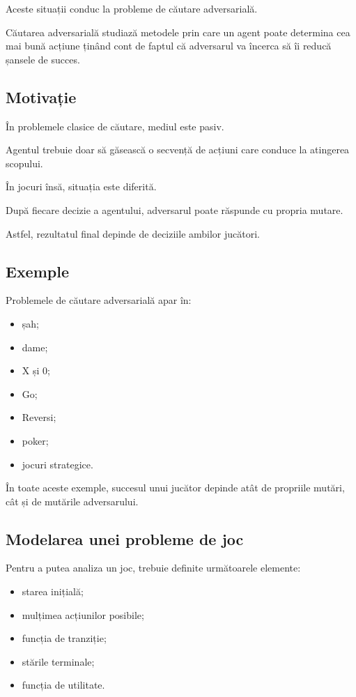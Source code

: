 \documentclass[12pt,a4paper]{article}
\begin{document}
Aceste situații conduc la probleme de căutare adversarială.

Căutarea adversarială studiază metodele prin care un agent poate determina cea mai bună acțiune ținând cont de faptul că adversarul va încerca să îi reducă șansele de succes.

\subsection{Motivație}

În problemele clasice de căutare, mediul este pasiv.

Agentul trebuie doar să găsească o secvență de acțiuni care conduce la atingerea scopului.

În jocuri însă, situația este diferită.

După fiecare decizie a agentului, adversarul poate răspunde cu propria mutare.

Astfel, rezultatul final depinde de deciziile ambilor jucători.

\subsection{Exemple}

Problemele de căutare adversarială apar în:

\begin{itemize}
\item șah;
\item dame;
\item X și 0;
\item Go;
\item Reversi;
\item poker;
\item jocuri strategice.
\end{itemize}

În toate aceste exemple, succesul unui jucător depinde atât de propriile mutări, cât și de mutările adversarului.

\subsection{Modelarea unei probleme de joc}

Pentru a putea analiza un joc, trebuie definite următoarele elemente:

\begin{itemize}
\item starea inițială;
\item mulțimea acțiunilor posibile;
\item funcția de tranziție;
\item stările terminale;
\item funcția de utilitate.
\end{itemize}
\end{document}
